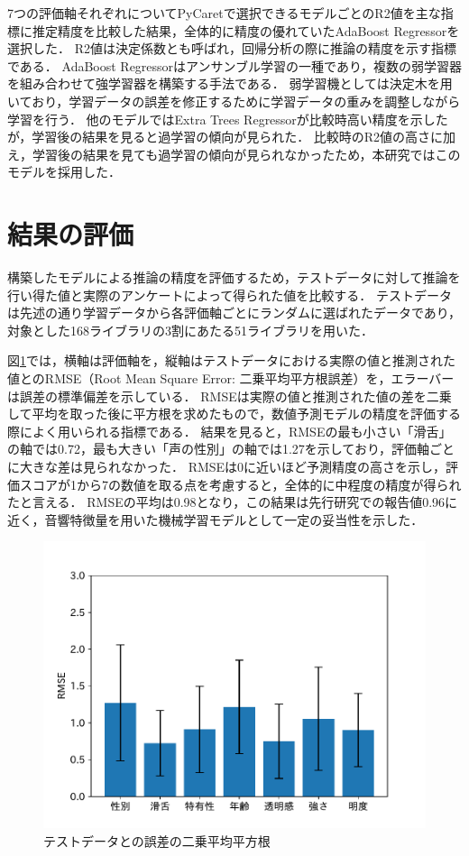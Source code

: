 7つの評価軸それぞれについてPyCaretで選択できるモデルごとのR2値を主な指標に推定精度を比較した結果，全体的に精度の優れていたAdaBoost Regressorを選択した．
R2値は決定係数とも呼ばれ，回帰分析の際に推論の精度を示す指標である．
AdaBoost Regressorはアンサンブル学習の一種であり，複数の弱学習器を組み合わせて強学習器を構築する手法である．
弱学習機としては決定木を用いており，学習データの誤差を修正するために学習データの重みを調整しながら学習を行う．
他のモデルではExtra Trees Regressorが比較時高い精度を示したが，学習後の結果を見ると過学習の傾向が見られた．
比較時のR2値の高さに加え，学習後の結果を見ても過学習の傾向が見られなかったため，本研究ではこのモデルを採用した．

\section{結果の評価}
\label{sec:eval}

構築したモデルによる推論の精度を評価するため，テストデータに対して推論を行い得た値と実際のアンケートによって得られた値を比較する．
テストデータは先述の通り学習データから各評価軸ごとにランダムに選ばれたデータであり，対象とした168ライブラリの3割にあたる51ライブラリを用いた．

図\ref{tab:score_box}では，横軸は評価軸を，縦軸はテストデータにおける実際の値と推測された値とのRMSE（Root Mean Square Error: 二乗平均平方根誤差）を，エラーバーは誤差の標準偏差を示している．
RMSEは実際の値と推測された値の差を二乗して平均を取った後に平方根を求めたもので，数値予測モデルの精度を評価する際によく用いられる指標である．
結果を見ると，RMSEの最も小さい「滑舌」の軸では0.72，最も大きい「声の性別」の軸では1.27を示しており，評価軸ごとに大きな差は見られなかった．
RMSEは0に近いほど予測精度の高さを示し，評価スコアが1から7の数値を取る点を考慮すると，全体的に中程度の精度が得られたと言える．
RMSEの平均は0.98となり，この結果は先行研究\cite{dnn}での報告値0.96に近く，音響特徴量を用いた機械学習モデルとして一定の妥当性を示した．

\begin{figure}[htb]
  \centering
  \includegraphics[width=\linewidth]{fig/rmse.pdf}
  \caption{テストデータとの誤差の二乗平均平方根}
  \label{tab:score_box}
\end{figure}

